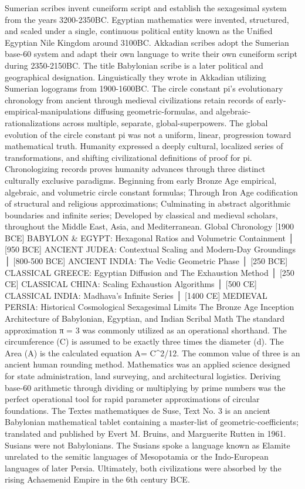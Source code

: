Sumerian scribes invent cuneiform script and establish the sexagesimal system from the years 3200-2350BC. Egyptian mathematics were invented, structured, and scaled under a single, continuous political entity known as the Unified Egyptian Nile Kingdom around 3100BC. Akkadian scribes adopt the Sumerian base-60 system and adapt their own language to write their own cuneiform script during 2350-2150BC. The title Babylonian scribe is a later political and geographical designation. Linguistically they wrote in Akkadian utilizing Sumerian logograms from 1900-1600BC. The circle constant pi’s evolutionary chronology from ancient through medieval civilizations retain records of early-empirical-manipulations diffusing geometric-formulas, and algebraic-rationalizations across multiple, separate, global-superpowers. The global evolution of the circle constant pi was not a uniform, linear, progression toward mathematical truth. Humanity expressed a deeply cultural, localized series of transformations, and shifting civilizational definitions of proof for pi. Chronologizing records proves humanity advances through three distinct culturally exclusive paradigms. Beginning from early Bronze Age empirical, algebraic, and volumetric circle constant formulas; Through Iron Age codification of structural and religious approximations; Culminating in abstract algorithmic boundaries and infinite series; Developed by classical and medieval scholars, throughout the Middle East, Asia, and Mediterranean.
Global Chronology
 [1900 BCE] BABYLON & EGYPT: Hexagonal Ratios and Volumetric Containment 
       │
 [950 BCE] ANCIENT JUDEA: Contextual Scaling and Modern-Day Groundings
       │
 [800-500 BCE] ANCIENT INDIA: The Vedic Geometric Phase
       │ 
 [250 BCE] CLASSICAL GREECE: Egyptian Diffusion and The Exhaustion Method
       │
 [250 CE] CLASSICAL CHINA: Scaling Exhaustion Algorithms
       │
 [500 CE] CLASSICAL INDIA: Madhava’s Infinite Series
       │
 [1400 CE] MEDIEVAL PERSIA: Historical Cosmological Sexagesimal Limits
The Bronze Age Inception
Architecture of Babylonian, Egyptian, and Indian Scribal Math
The standard approximation π = 3 was commonly utilized as an operational shorthand. The circumference (C) is assumed to be exactly three times the diameter (d). The Area (A) is the calculated equation A= C^2/12. The common value of three is an ancient human rounding method. Mathematics was an applied science designed for state administration, land surveying, and architectural logistics. Deriving base-60 arithmetic through dividing or multiplying by prime numbers was the perfect operational tool for rapid parameter approximations of circular foundations. The Textes mathematiques de Suse, Text No. 3 is an ancient Babylonian mathematical tablet containing a master-list of geometric-coefficients; translated and published by Evert M. Bruins, and Marguerite Rutten in 1961. Susians were not Babylonians. The Susians spoke a language known as Elamite unrelated to the semitic languages of Mesopotamia or the Indo-European languages of later Persia. Ultimately, both civilizations were absorbed by the rising Achaemenid Empire in the 6th century BCE.
